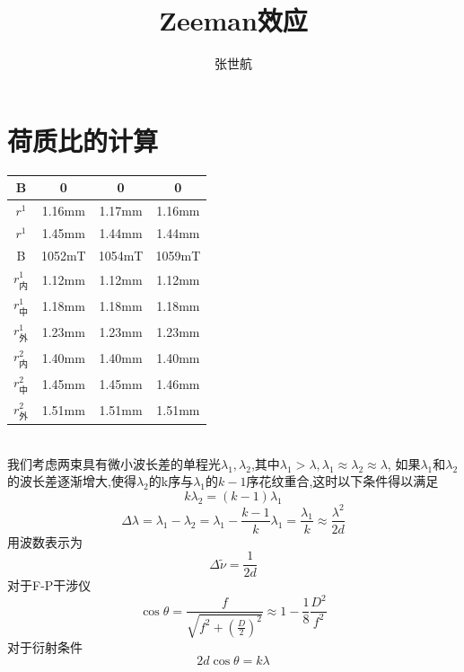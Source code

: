 \documentclass[10pt, a4paper]{article}
\author{张世航}
\title{Zeeman效应}
\begin{document}
	\maketitle
	\section{荷质比的计算}

	\begin{tabular}{|c|c|c|c|}
		\hline
		B & 0 & 0 & 0\\
		\hline
		\(r^1\)&1.16mm&1.17mm&1.16mm\\
		\hline
		\(r^1\)&1.45mm&1.44mm&1.44mm\\
		\hline
		
	
		
		\hline
		B & 1052mT & 1054mT & 1059mT\\
		\hline
		\(r^1_{\text{内}}\)&1.12mm&1.12mm&1.12mm\\
		\hline
		\(r^1_{\text{中}}\)&1.18mm&1.18mm&1.18mm\\
		\hline
		\(r^1_{\text{外}}\)&1.23mm&1.23mm&1.23mm\\
		\hline
		\(r^2_{\text{内}}\)&1.40mm&1.40mm&1.40mm\\
		\hline
		\(r^2_{\text{中}}\)&1.45mm&1.45mm&1.46mm\\
		\hline
		\(r^2_{\text{外}}\)&1.51mm&1.51mm&1.51mm\\
		\hline
	\end{tabular}\\
	我们考虑两束具有微小波长差的单程光\(\lambda_1,\lambda_2\),其中\(\lambda_1>\lambda,\lambda_1\approx\lambda_2\approx\lambda\),
	如果\(\lambda_1\)和\(\lambda_2\)的波长差逐渐增大,使得\(\lambda_2\)的k序与\(\lambda_1\)的\(k-1\)序花纹重合,这时以下条件得以满足
	\begin{equation}
		k\lambda_2 = (k-1)\lambda_1
	\end{equation}
	\begin{equation}
		\Delta \lambda = \lambda_1-\lambda_2 = \lambda_1-\frac{k-1}{k}\lambda_1=\frac{\lambda_1}{k}\approx\frac{\lambda^2}{2d}
	\end{equation}
	用波数表示为
	\begin{equation}
		\Delta \tilde{\nu} = \frac{1}{2d}
	\end{equation}
	对于F-P干涉仪
	\begin{equation}
		\cos\theta = \frac{f}{\sqrt{f^2+(\frac{D}{2})^2}}\approx1-\frac{1}{8}\frac{D^2}{f^2}
	\end{equation}
	对于衍射条件
	\begin{equation}
		2d\cos\theta = k\lambda
	\end{equation}
\end{document}
